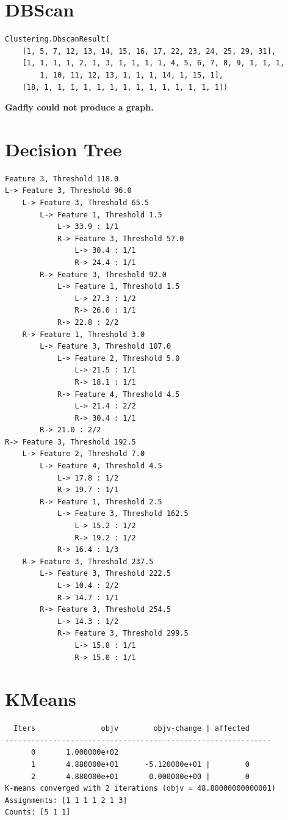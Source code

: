 \RequirePackage[l2tabu, orthodox]{nag} \documentclass[12pt]{scrartcl}
\begin{document}
\section{DBScan}
% 
\begin{verbatim}
Clustering.DbscanResult(
    [1, 5, 7, 12, 13, 14, 15, 16, 17, 22, 23, 24, 25, 29, 31],
    [1, 1, 1, 1, 2, 1, 3, 1, 1, 1, 1, 4, 5, 6, 7, 8, 9, 1, 1, 1,
        1, 10, 11, 12, 13, 1, 1, 1, 14, 1, 15, 1],
    [18, 1, 1, 1, 1, 1, 1, 1, 1, 1, 1, 1, 1, 1, 1])
\end{verbatim}

\textbf{Gadfly could not produce a graph.}

\section{Decision Tree}
% 

\begin{verbatim}
Feature 3, Threshold 118.0
L-> Feature 3, Threshold 96.0
    L-> Feature 3, Threshold 65.5
        L-> Feature 1, Threshold 1.5
            L-> 33.9 : 1/1
            R-> Feature 3, Threshold 57.0
                L-> 30.4 : 1/1
                R-> 24.4 : 1/1
        R-> Feature 3, Threshold 92.0
            L-> Feature 1, Threshold 1.5
                L-> 27.3 : 1/2
                R-> 26.0 : 1/1
            R-> 22.8 : 2/2
    R-> Feature 1, Threshold 3.0
        L-> Feature 3, Threshold 107.0
            L-> Feature 2, Threshold 5.0
                L-> 21.5 : 1/1
                R-> 18.1 : 1/1
            R-> Feature 4, Threshold 4.5
                L-> 21.4 : 2/2
                R-> 30.4 : 1/1
        R-> 21.0 : 2/2
R-> Feature 3, Threshold 192.5
    L-> Feature 2, Threshold 7.0
        L-> Feature 4, Threshold 4.5
            L-> 17.8 : 1/2
            R-> 19.7 : 1/1
        R-> Feature 1, Threshold 2.5
            L-> Feature 3, Threshold 162.5
                L-> 15.2 : 1/2
                R-> 19.2 : 1/2
            R-> 16.4 : 1/3
    R-> Feature 3, Threshold 237.5
        L-> Feature 3, Threshold 222.5
            L-> 10.4 : 2/2
            R-> 14.7 : 1/1
        R-> Feature 3, Threshold 254.5
            L-> 14.3 : 1/2
            R-> Feature 3, Threshold 299.5
                L-> 15.8 : 1/1
                R-> 15.0 : 1/1
\end{verbatim}

\section{KMeans}
% 
\begin{verbatim}
  Iters               objv        objv-change | affected
-------------------------------------------------------------
      0       1.000000e+02
      1       4.880000e+01      -5.120000e+01 |        0
      2       4.880000e+01       0.000000e+00 |        0
K-means converged with 2 iterations (objv = 48.80000000000001)
Assignments: [1 1 1 1 2 1 3]
Counts: [5 1 1]
\end{verbatim}
\end{document}
